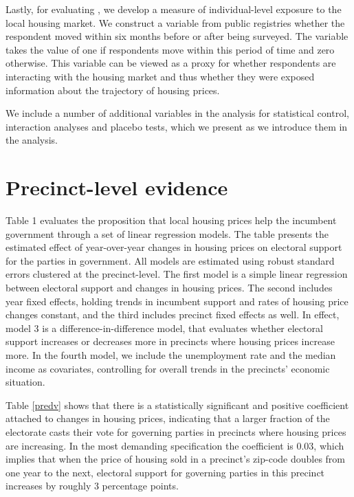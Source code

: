 \documentclass[12pt,a4paper]{article}
\begin{document}
	Lastly, for evaluating \htwo, we develop a measure of individual-level exposure to the local housing market. We construct a variable from public registries whether the respondent moved within six months before or after being surveyed. The variable takes the value of one if respondents move within this period of time and zero otherwise. This variable can be viewed as a proxy for whether respondents are interacting with the housing market and thus whether they were exposed information about the trajectory of housing prices.
	
	We include a number of additional variables in the analysis for statistical control, interaction analyses and placebo tests, which we present as we introduce them in the analysis. 
	
	
	
	\section{Precinct-level evidence}
	Table 1 evaluates the proposition that local housing prices help the incumbent government through a set of linear regression models. The table presents the estimated effect of year-over-year changes in housing prices on electoral support for the parties in government. All models are estimated using robust standard errors clustered at the precinct-level. The first model is a simple linear regression between electoral support and changes in housing prices. The second includes year fixed effects, holding trends in incumbent support and rates of housing price changes constant, and the third includes precinct fixed effects as well. In effect, model 3 is a difference-in-difference model, that evaluates whether electoral support increases or decreases more in precincts where housing prices increase more.  In the fourth model, we include the unemployment rate and the median income as covariates, controlling for overall  trends in the precincts’ economic situation. 
	
	
	
	Table \ref{predv} shows that there is a statistically significant and positive coefficient attached to changes in housing prices, indicating that a larger fraction of the electorate casts their vote for governing parties in precincts where housing prices are increasing. In the most demanding specification the coefficient is 0.03, which implies that when the price of housing sold in a precinct's zip-code doubles from one year to the next, electoral support for governing parties in this precinct increases by roughly 3 percentage points.
	
\end{document}
